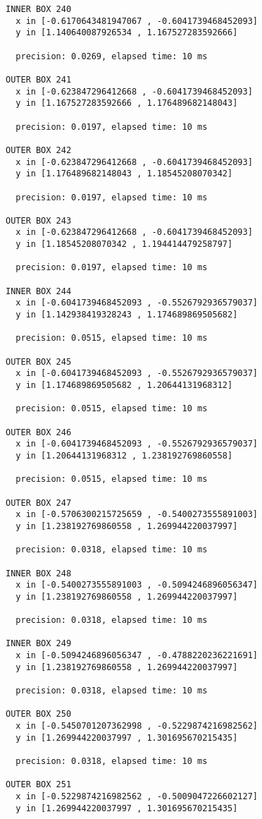 \begin{verbatim}
INNER BOX 240
  x in [-0.6170643481947067 , -0.6041739468452093]
  y in [1.140640087926534 , 1.167527283592666]

  precision: 0.0269, elapsed time: 10 ms

OUTER BOX 241
  x in [-0.623847296412668 , -0.6041739468452093]
  y in [1.167527283592666 , 1.176489682148043]

  precision: 0.0197, elapsed time: 10 ms

OUTER BOX 242
  x in [-0.623847296412668 , -0.6041739468452093]
  y in [1.176489682148043 , 1.18545208070342]

  precision: 0.0197, elapsed time: 10 ms

OUTER BOX 243
  x in [-0.623847296412668 , -0.6041739468452093]
  y in [1.18545208070342 , 1.194414479258797]

  precision: 0.0197, elapsed time: 10 ms

INNER BOX 244
  x in [-0.6041739468452093 , -0.5526792936579037]
  y in [1.142938419328243 , 1.174689869505682]

  precision: 0.0515, elapsed time: 10 ms

OUTER BOX 245
  x in [-0.6041739468452093 , -0.5526792936579037]
  y in [1.174689869505682 , 1.20644131968312]

  precision: 0.0515, elapsed time: 10 ms

OUTER BOX 246
  x in [-0.6041739468452093 , -0.5526792936579037]
  y in [1.20644131968312 , 1.238192769860558]

  precision: 0.0515, elapsed time: 10 ms

OUTER BOX 247
  x in [-0.5706300215725659 , -0.5400273555891003]
  y in [1.238192769860558 , 1.269944220037997]

  precision: 0.0318, elapsed time: 10 ms

INNER BOX 248
  x in [-0.5400273555891003 , -0.5094246896056347]
  y in [1.238192769860558 , 1.269944220037997]

  precision: 0.0318, elapsed time: 10 ms

INNER BOX 249
  x in [-0.5094246896056347 , -0.4788220236221691]
  y in [1.238192769860558 , 1.269944220037997]

  precision: 0.0318, elapsed time: 10 ms

OUTER BOX 250
  x in [-0.5450701207362998 , -0.5229874216982562]
  y in [1.269944220037997 , 1.301695670215435]

  precision: 0.0318, elapsed time: 10 ms

OUTER BOX 251
  x in [-0.5229874216982562 , -0.5009047226602127]
  y in [1.269944220037997 , 1.301695670215435]


\end{verbatim}
